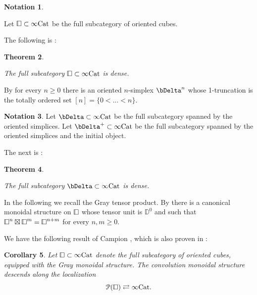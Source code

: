 \documentclass[10pt,oneside]{article}
\numberwithin{equation}{section} %
\numberwithin{figure}{section} %
\theoremstyle{plain}
\newtheorem{theorem}{Theorem}[subsection]
\newtheorem{corollary}[theorem]{Corollary}
\theoremstyle{definition}
\newtheorem{notation}[theorem]{Notation}
\newcommand{\bD}{{\mathbb D}}
\newcommand{\mP}{{\mathcal P}}
\newcommand{\Cat}{\mathrm{Cat}}
\newcommand{\cube}{{\,\vline\negmedspace\square}}
\begin{document}
\begin{notation}\label{sqGray}

Let $\cube \subset \infty\Cat$ be the full subcategory of oriented cubes.
\end{notation}

The following is \cite[Theorem 2.8.12.]{GepnerHeine2026}:

\begin{theorem}\label{cubedense}

The full subcategory $\cube \subset \infty\Cat$ is dense.
    
\end{theorem}

By \cite[Definition 2.6.32.]{GepnerHeine2026} for every $n \geq 0$ there is an oriented $n$-simplex $\bDelta^n$
whose 1-truncation is the totally ordered set $[n]= \{0 < ...< n \}.$

\begin{notation}

Let $\bDelta \subset\infty\Cat$ be the full subcategory spanned by the oriented simplices.
Let $\bDelta^+ \subset\infty\Cat$ be the full subcategory spanned by the oriented simplices and the initial object.
  
\end{notation}

The next is \cite[Theorem 2.7.8.]{GepnerHeine2026}:

\begin{theorem}\label{orientdense}

The full subcategory $\bDelta\subset\infty\Cat$ is dense.
    
\end{theorem}

In the following we recall the Gray tensor product.
By \cite[Definition 2.6.23.]{GepnerHeine2026} there is a canonical monoidal structure on $\cube$ whose tensor unit is
$\bD^0$ and such that $\cube^n \boxtimes \cube^m= \cube^{n+m}$ for every $n,m \geq 0.$



We have the following result of Campion \cite{campion2022cubesdenseinftyinftycategories}, which is also proven in \cite[Corollary 3.4.2.]{GepnerHeine2026}:

\begin{corollary}\label{locmon2}
Let $\cube \subset \infty\Cat$ denote the full subcategory of oriented cubes, equipped with the Gray monoidal structure.
The convolution monoidal structure descends along 
the localization $$\mP(\cube) \rightleftarrows \infty\Cat.$$

\end{corollary}
\end{document}
